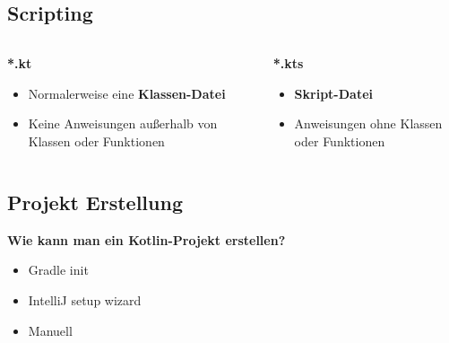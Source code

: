     \subsection{Scripting}\label{subsec:scripting}
    \begin{frame}
        \slidehead
        \begin{columns}[c]
            \begin{column}{.5\textwidth}
                \centering
                \Large
                \textbf{*.kt}
                \vspace{1em}
                \normalsize
                \begin{itemize}
                    \item Normalerweise eine \textbf{Klassen-Datei}
                    \item Keine Anweisungen außerhalb von Klassen oder Funktionen
                \end{itemize}
            \end{column}
            \begin{column}{.5\textwidth}
                \centering
                \Large
                \textbf{*.kts}
                \vspace{1em}
                \normalsize
                \begin{itemize}
                    \item \textbf{Skript-Datei}
                    \item Anweisungen ohne Klassen oder Funktionen
                \end{itemize}
            \end{column}
        \end{columns}
    \end{frame}

    \subsection{Projekt Erstellung}\label{subsec:projekt-erstellung}
    \begin{frame}
        \slidehead
        \large
        \textbf{Wie kann man ein Kotlin-Projekt erstellen?}
        \begin{itemize}[<+->]
            \item Gradle init
            \item IntelliJ setup wizard
            \item Manuell
        \end{itemize}
    \end{frame}

